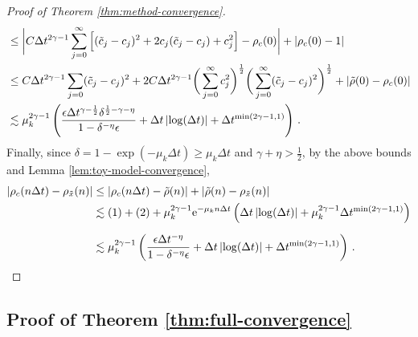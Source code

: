 \documentclass[12pt]{article} %
\newcommand{\abs}[1]{\left| #1 \right|}
\begin{document}
\begin{proof}[Proof of Theorem \ref{thm:method-convergence}]
\begin{align*}
& \leq \bigg| C \Delta t^{2 \gamma - 1} \sum_{j = 0}^\infty \Big[(\Tilde{c}_j - c_j)^2 
+ 2c_j(\Tilde{c}_j - c_j)%
+ c_j^2  \Big] - \rho_c(0) \bigg| + \left| \rho_c(0) - 1 \right| \\
& \leq C \Delta t^{2 \gamma - 1} \sum_{j = 0} (\Tilde{c}_j - c_j)^2 + 2C \Delta t^{2 \gamma - 1} \bigg(\sum_{j = 0}^\infty c_j^2\bigg)^{\frac12} \bigg(\sum_{j = 0}^\infty (\Tilde{c}_j - c_j)^2\bigg)^{\frac12} + |\Tilde{\rho}(0) - \rho_c(0)| \\ 
& \lesssim \mu_k^{2 \gamma - 1} \left( \frac{\epsilon\Delta t^{\gamma - \frac{1}{2}} \delta^{\frac{1}{2}-\gamma - \eta}}{1 - \delta^{-\eta} \epsilon} + \Delta t \abs{\log(\Delta t)} + \Delta t^{\min(2 \gamma - 1, 1)} \right)\, .
\end{align*}
%
Finally,  since  $\delta = 1 - \exp(-\mu_k \Delta t)
\geq\mu_k \Delta t$  and $\gamma + \eta > \tfrac12$,  by the above bounds and Lemma \ref{lem:toy-model-convergence},
\begin{align*}
\left|\rho_c(n\Delta t) - \rho_{\Tilde{x}}(n) \right| & \leq \left| \rho_c(n\Delta t) - \Tilde{\rho}(n) \right| + \left|\Tilde{\rho}(n) - \rho_{\Tilde{x}}(n) \right| \\
& \lesssim (1) + (2) + \mu_k^{2 \gamma - 1} \mathrm{e}^{- \mu_k  n\Delta t } \left( \Delta t \abs{\log(\Delta t)} + \mu_k^{2 \gamma - 1}\Delta t^{\min(2\gamma - 1, 1)} \right)  \\[0.2cm]
& \lesssim \mu_k^{2 \gamma - 1} \left(\frac{\epsilon \Delta t^{-\eta} }{1 - \delta^{-\eta} \epsilon} + \Delta t \abs{\log(\Delta t)} + \Delta t^{\min(2\gamma - 1, 1)} \right)\, . \hfill\qedhere
\end{align*}
\end{proof}

\subsection{Proof of Theorem \ref{thm:full-convergence}} \label{suppl:proof-thm-3}
\end{document}
